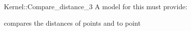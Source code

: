 \begin{ccRefFunctionObjectConcept}{Kernel::Compare_distance_3}
A model for this must provide:


{}

      {compares the distances of points  and  to point }

\end{ccRefFunctionObjectConcept}
